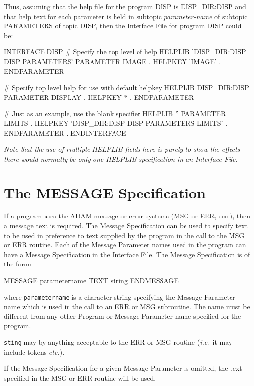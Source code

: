 \documentclass[twoside,11pt,nolof]{starlink}
\begin{document}
Thus, assuming that the help file for the program DISP is
DISP\_DIR:DISP and that help text for each parameter is held in subtopic
\emph{parameter-name} of subtopic PARAMETERS of topic DISP, then
the Interface File for program DISP could be:
\begin{terminalv}
INTERFACE DISP
# Specify the top level of help
   HELPLIB 'DISP_DIR:DISP DISP PARAMETERS'
   PARAMETER IMAGE
         .
      HELPKEY 'IMAGE'
         .
   ENDPARAMETER

# Specify top level help for use with default helpkey
   HELPLIB DISP_DIR:DISP
   PARAMETER DISPLAY
         .
      HELPKEY *
         .
   ENDPARAMETER

# Just as an example, use the blank specifier
   HELPLIB ''
   PARAMETER LIMITS
         .
      HELPKEY 'DISP_DIR:DISP DISP PARAMETERS LIMITS'
         .
   ENDPARAMETER
      .
ENDINTERFACE
\end{terminalv}
\emph{Note that the use of multiple HELPLIB fields here is purely to show the
effects -- there would normally be only one HELPLIB specification in
an Interface File.}

\section{The MESSAGE Specification}

If a program uses the ADAM message or error systems (MSG or ERR, see
), then a message text is required.
The Message Specification can be used to specify text to be used in preference
to text supplied by the program in the call to the MSG or ERR routine.
Each of the Message Parameter names used in the program can have
a Message Specification in the Interface File. The Message Specification
is of the form:
\begin{terminalv}
MESSAGE parametername
  TEXT  string
ENDMESSAGE
\end{terminalv}
where \texttt{parametername} is a character string specifying the Message
Parameter name which is used in the call to an ERR or MSG subroutine.
The name must be different from any other Program or Message Parameter name
specified for the program.

\texttt{sting} may by anything acceptable to the ERR or MSG routine
(\emph{i.e.}\ it may include tokens \emph{etc.}).

If the Message Specification for a given Message Parameter is omitted, the
text specified in the MSG or ERR routine will be used.
\end{document}
